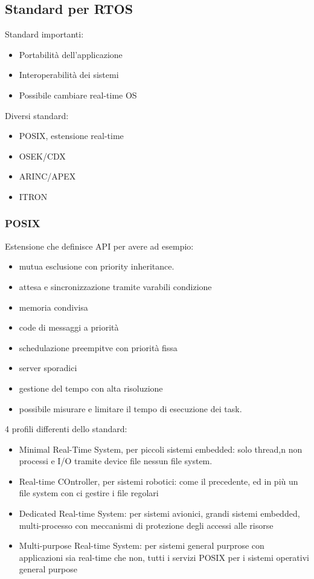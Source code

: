 \documentclass[12pt, oneside]{extbook}
\begin{document}
\subsection{Standard per RTOS}
Standard importanti:
\begin{itemize}
\item Portabilità dell'applicazione
\item Interoperabilità dei sistemi
\item Possibile cambiare real-time OS
\end{itemize}
Diversi standard:
\begin{itemize}
\item POSIX, estensione real-time
\item OSEK/CDX
\item ARINC/APEX
\item ITRON
\end{itemize}
\subsubsection{POSIX}
Estensione che definisce API per avere ad esempio:
\begin{itemize}
\item mutua esclusione con priority inheritance.
\item attesa e sincronizzazione tramite varabili condizione
\item memoria condivisa
\item code di messaggi a priorità
\item schedulazione preempitve con priorità fissa
\item server sporadici
\item gestione del tempo con alta risoluzione
\item possibile misurare e limitare il tempo di esecuzione dei task.
\end{itemize}
4 profili differenti dello standard:
\begin{itemize}
\item Minimal Real-Time System, per piccoli sistemi embedded: solo thread,n non processi e I/O tramite device file nessun file system.
\item Real-time COntroller, per sistemi robotici: come il precedente, ed in più un file system con ci gestire i file regolari
\item Dedicated Real-time System: per sistemi avionici, grandi sistemi embedded, multi-processo con meccanismi di protezione degli accessi alle risorse
\item Multi-purpose Real-time System: per sistemi general purprose con applicazioni sia real-time che non, tutti i servizi POSIX per i sistemi operativi general purpose
\end{itemize}
\end{document}
